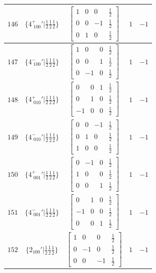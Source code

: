 \documentclass[fleqn,8pt]{jsarticle}
\begin{document}
\begin{longtable}{ccccc}
$ 146 $ & $ \{4^{+}_{\,\,100}{}'|\frac{1}{2} \frac{1}{2} \frac{1}{2}\} $ & $ \begin{bmatrix} 1 & 0 & 0 & \frac{1}{2} \\ 0 & 0 & -1 & \frac{1}{2} \\ 0 & 1 & 0 & \frac{1}{2} \end{bmatrix} $ & $ 1 $ & $ -1 $ \\ \hline
$ 147 $ & $ \{4^{-}_{\,\,100}{}'|\frac{1}{2} \frac{1}{2} \frac{1}{2}\} $ & $ \begin{bmatrix} 1 & 0 & 0 & \frac{1}{2} \\ 0 & 0 & 1 & \frac{1}{2} \\ 0 & -1 & 0 & \frac{1}{2} \end{bmatrix} $ & $ 1 $ & $ -1 $ \\ \hline
$ 148 $ & $ \{4^{+}_{\,\,010}{}'|\frac{1}{2} \frac{1}{2} \frac{1}{2}\} $ & $ \begin{bmatrix} 0 & 0 & 1 & \frac{1}{2} \\ 0 & 1 & 0 & \frac{1}{2} \\ -1 & 0 & 0 & \frac{1}{2} \end{bmatrix} $ & $ 1 $ & $ -1 $ \\ \hline
$ 149 $ & $ \{4^{-}_{\,\,010}{}'|\frac{1}{2} \frac{1}{2} \frac{1}{2}\} $ & $ \begin{bmatrix} 0 & 0 & -1 & \frac{1}{2} \\ 0 & 1 & 0 & \frac{1}{2} \\ 1 & 0 & 0 & \frac{1}{2} \end{bmatrix} $ & $ 1 $ & $ -1 $ \\ \hline
$ 150 $ & $ \{4^{+}_{\,\,001}{}'|\frac{1}{2} \frac{1}{2} \frac{1}{2}\} $ & $ \begin{bmatrix} 0 & -1 & 0 & \frac{1}{2} \\ 1 & 0 & 0 & \frac{1}{2} \\ 0 & 0 & 1 & \frac{1}{2} \end{bmatrix} $ & $ 1 $ & $ -1 $ \\ \hline
$ 151 $ & $ \{4^{-}_{\,\,001}{}'|\frac{1}{2} \frac{1}{2} \frac{1}{2}\} $ & $ \begin{bmatrix} 0 & 1 & 0 & \frac{1}{2} \\ -1 & 0 & 0 & \frac{1}{2} \\ 0 & 0 & 1 & \frac{1}{2} \end{bmatrix} $ & $ 1 $ & $ -1 $ \\ \hline
$ 152 $ & $ \{2{}_{100}{}'|\frac{1}{2} \frac{1}{2} \frac{1}{2}\} $ & $ \begin{bmatrix} 1 & 0 & 0 & \frac{1}{2} \\ 0 & -1 & 0 & \frac{1}{2} \\ 0 & 0 & -1 & \frac{1}{2} \end{bmatrix} $ & $ 1 $ & $ -1 $ \\ \hline

\end{longtable}
\end{document}

